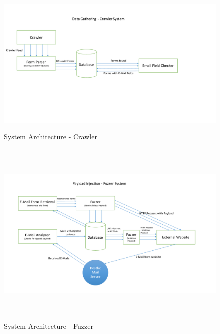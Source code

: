 \begin{figure}
     \centering
     \includegraphics[width=16cm, height=7cm]{System/crawler_design}
     \caption{System Architecture - Crawler}
     \label{fig:crawler}
 \end{figure}
 
 
 \begin{figure}
 	\centering
 	\includegraphics[width=16cm, height=9cm]{System/fuzzer_design}
 	\caption{System Architecture - Fuzzer}
 	\label{fig:fuzzer}
 \end{figure}
 